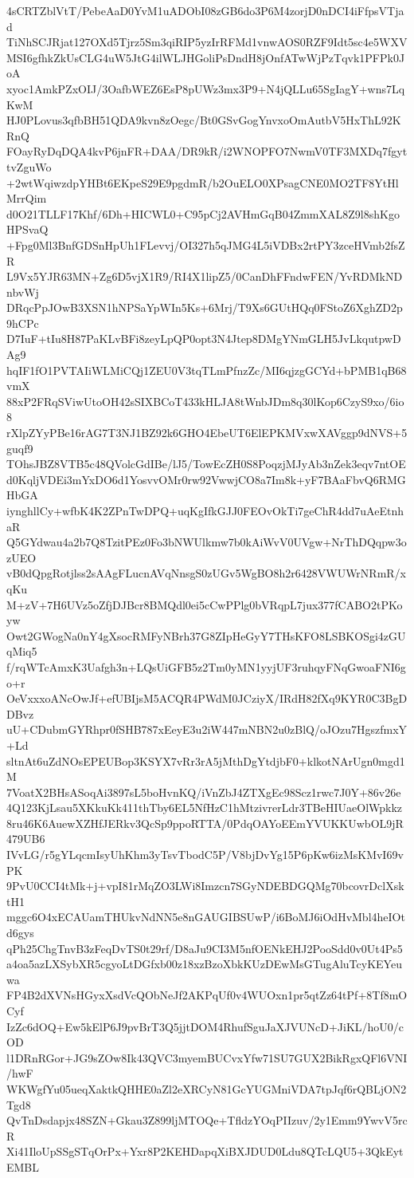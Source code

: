 4sCRTZblVtT/PebeAaD0YvM1uADObI08zGB6do3P6M4zorjD0nDCI4iFfpsVTjad
TiNhSCJRjat127OXd5Tjrz5Sm3qiRIP5yzIrRFMd1vnwAOS0RZF9Idt5sc4e5WXV
MSI6gfhkZkUsCLG4uW5JtG4ilWLJHGoliPsDndH8jOnfATwWjPzTqvk1PFPk0JoA
xyoc1AmkPZxOIJ/3OafbWEZ6EsP8pUWz3mx3P9+N4jQLLu65SgIagY+wns7LqKwM
HJ0PLovus3qfbBH51QDA9kvn8zOegc/Bt0GSvGogYnvxoOmAutbV5HxThL92KRnQ
FOayRyDqDQA4kvP6jnFR+DAA/DR9kR/i2WNOPFO7NwmV0TF3MXDq7fgyttvZguWo
+2wtWqiwzdpYHBt6EKpeS29E9pgdmR/b2OuELO0XPsagCNE0MO2TF8YtHlMrrQim
d0O21TLLF17Khf/6Dh+HICWL0+C95pCj2AVHmGqB04ZmmXAL8Z9l8shKgoHPSvaQ
+Fpg0Ml3BnfGDSnHpUh1FLevvj/OI327h5qJMG4L5iVDBx2rtPY3zceHVmb2fsZR
L9Vx5YJR63MN+Zg6D5vjX1R9/RI4X1lipZ5/0CanDhFFndwFEN/YvRDMkNDnbvWj
DRqcPpJOwB3XSN1hNPSaYpWIn5Ks+6Mrj/T9Xs6GUtHQq0FStoZ6XghZD2p9hCPc
D7IuF+tIu8H87PaKLvBFi8zeyLpQP0opt3N4Jtep8DMgYNmGLH5JvLkqutpwDAg9
hqIF1fO1PVTAIiWLMiCQj1ZEU0V3tqTLmPfnzZc/MI6qjzgGCYd+bPMB1qB68vmX
88xP2FRqSViwUtoOH42sSIXBCoT433kHLJA8tWnbJDm8q30lKop6CzyS9xo/6io8
rXlpZYyPBe16rAG7T3NJ1BZ92k6GHO4EbeUT6ElEPKMVxwXAVggp9dNVS+5guqf9
TOhsJBZ8VTB5c48QVolcGdIBe/lJ5/TowEcZH0S8PoqzjMJyAb3nZek3eqv7ntOE
d0KqljVDEi3mYxDO6d1YosvvOMr0rw92VwwjCO8a7Im8k+yF7BAaFbvQ6RMGHbGA
iynghllCy+wfbK4K2ZPnTwDPQ+uqKgIfkGJJ0FEOvOkTi7geChR4dd7uAeEtnhaR
Q5GYdwau4a2b7Q8TzitPEz0Fo3bNWUlkmw7b0kAiWvV0UVgw+NrThDQqpw3ozUEO
vB0dQpgRotjlss2sAAgFLucnAVqNnsgS0zUGv5WgBO8h2r6428VWUWrNRmR/xqKu
M+zV+7H6UVz5oZfjDJBcr8BMQdl0ei5cCwPPlg0bVRqpL7jux377fCABO2tPKoyw
Owt2GWogNa0nY4gXsocRMFyNBrh37G8ZIpHeGyY7THsKFO8LSBKOSgi4zGUqMiq5
f/rqWTcAmxK3Uafgh3n+LQsUiGFB5z2Tm0yMN1yyjUF3ruhqyFNqGwoaFNI6go+r
OeVxxxoANcOwJf+efUBIjsM5ACQR4PWdM0JCziyX/IRdH82fXq9KYR0C3BgDDBvz
uU+CDubmGYRhpr0fSHB787xEeyE3u2iW447mNBN2u0zBlQ/oJOzu7HgszfmxY+Ld
sltnAt6uZdNOsEPEUBop3KSYX7vRr3rA5jMthDgYtdjbF0+klkotNArUgn0mgd1M
7VoatX2BHsASoqAi3897sL5boHvnKQ/iVnZbJ4ZTXgEc98Scz1rwc7J0Y+86v26e
4Q123KjLsau5XKkuKk411thTby6EL5NfHzC1hMtzivrerLdr3TBeHIUaeOlWpkkz
8ru46K6AuewXZHfJERkv3QcSp9ppoRTTA/0PdqOAYoEEmYVUKKUwbOL9jR479UB6
IVvLG/r5gYLqcmIsyUhKhm3yTsvTbodC5P/V8bjDvYg15P6pKw6izMsKMvI69vPK
9PvU0CCI4tMk+j+vpI81rMqZO3LWi8Imzcn7SGyNDEBDGQMg70bcovrDclXsktH1
mggc6O4xECAUamTHUkvNdNN5e8nGAUGIBSUwP/i6BoMJ6iOdHvMbl4heIOtd6gys
qPh25ChgTnvB3zFeqDvTS0t29rf/D8aJu9CI3M5nfOENkEHJ2PooSdd0v0Ut4Ps5
a4oa5azLXSybXR5cgyoLtDGfxb00z18xzBzoXbkKUzDEwMsGTugAluTcyKEYeuwa
FP4B2dXVNsHGyxXsdVcQObNeJf2AKPqUf0v4WUOxn1pr5qtZz64tPf+8Tf8mOCyf
IzZc6dOQ+Ew5kElP6J9pvBrT3Q5jjtDOM4RhufSguJaXJVUNcD+JiKL/hoU0/cOD
l1DRnRGor+JG9sZOw8Ik43QVC3myemBUCvxYfw71SU7GUX2BikRgxQFl6VNI/hwF
WKWgfYu05ueqXaktkQHHE0aZl2eXRCyN81GcYUGMniVDA7tpJqf6rQBLjON2Tgd8
QvTnDsdapjx48SZN+Gkau3Z899ljMTOQe+TfldzYOqPIIzuv/2y1Emm9YwvV5rcR
Xi41IloUpSSgSTqOrPx+Yxr8P2KEHDapqXiBXJDUD0Ldu8QTcLQU5+3QkEytEMBL
